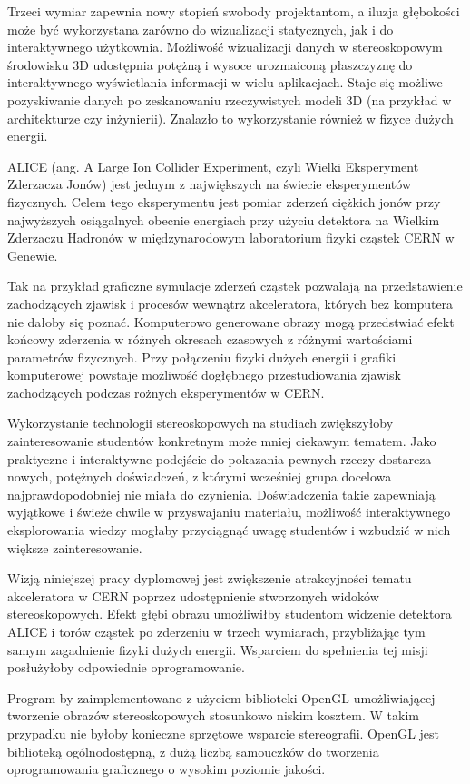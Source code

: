 Trzeci wymiar zapewnia nowy stopień swobody projektantom, a iluzja głębokości może być wykorzystana zarówno do wizualizacji statycznych, jak i do interaktywnego użytkownia. Możliwość wizualizacji danych w stereoskopowym środowisku 3D udostępnia potężną i wysoce urozmaiconą płaszczyznę do interaktywnego wyświetlania informacji w wielu aplikacjach. Staje się możliwe pozyskiwanie danych po zeskanowaniu rzeczywistych modeli 3D (na przykład w architekturze czy inżynierii). Znalazło to wykorzystanie również w fizyce dużych energii. 

ALICE (ang. A Large Ion Collider Experiment, czyli Wielki Eksperyment Zderzacza Jonów) jest jednym z największych na świecie eksperymentów fizycznych. Celem tego eksperymentu jest pomiar zderzeń ciężkich jonów przy najwyższych osiągalnych obecnie energiach przy użyciu detektora na Wielkim Zderzaczu Hadronów w międzynarodowym laboratorium fizyki cząstek CERN w Genewie. 

Tak na przykład graficzne symulacje zderzeń cząstek pozwalają na przedstawienie zachodzących zjawisk i procesów wewnątrz akceleratora, których bez komputera nie dałoby się poznać. Komputerowo generowane obrazy mogą przedstwiać efekt końcowy zderzenia w różnych okresach czasowych z różnymi wartościami parametrów fizycznych. Przy połączeniu fizyki dużych energii i grafiki komputerowej powstaje możliwość dogłębnego przestudiowania zjawisk zachodzących podczas rożnych eksperymentów w CERN. 

Wykorzystanie technologii stereoskopowych na studiach zwiększyłoby zainteresowanie studentów konkretnym może mniej ciekawym tematem. Jako praktyczne i interaktywne podejście do pokazania pewnych rzeczy dostarcza nowych, potężnych doświadczeń, z którymi wcześniej grupa docelowa najprawdopodobniej nie miała do czynienia. Doświadczenia takie zapewniają wyjątkowe i świeże chwile w przyswajaniu materiału, możliwość interaktywnego eksplorowania wiedzy mogłaby przyciągnąć uwagę studentów i wzbudzić w nich większe zainteresowanie. 

Wizją niniejszej pracy dyplomowej jest zwiększenie atrakcyjności tematu akceleratora w CERN poprzez udostępnienie stworzonych widoków stereoskopowych. Efekt głębi obrazu umożliwiłby studentom widzenie detektora ALICE i torów cząstek po zderzeniu w trzech wymiarach, przybliżając tym samym zagadnienie fizyki dużych energii. Wsparciem do spełnienia tej misji posłużyłoby odpowiednie oprogramowanie. 

Program by zaimplementowano z użyciem biblioteki OpenGL umożliwiającej tworzenie obrazów stereoskopowych stosunkowo niskim kosztem. W takim przypadku nie byłoby konieczne sprzętowe wsparcie stereografii. OpenGL jest biblioteką ogólnodostępną, z dużą liczbą samouczków do tworzenia oprogramowania graficznego o wysokim poziomie jakości. 

